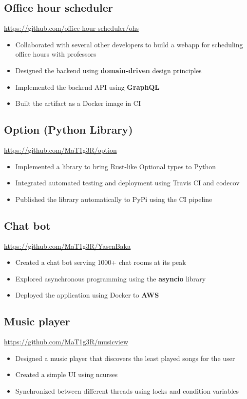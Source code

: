 \documentclass[letterpaper,12pt,oneside]{article}
\newcommand{\smallurl}[1]{\footnotesize{\url{#1}}\normalsize}
\begin{document}
\subsection*{Office hour scheduler \hfill {}}
\smallurl{https://github.com/office-hour-scheduler/ohs}
\begin{itemize}
      \setlength\itemsep{0em}
      \item Collaborated with several other developers to build a webapp for scheduling office hours with professors
      \item Designed the backend using \textbf{domain-driven} design principles
      \item Implemented the backend API using \textbf{GraphQL}
      \item Built the artifact as a Docker image in CI
\end{itemize}

\subsection*{Option (Python Library) \hfill {}}
\smallurl{https://github.com/MaT1g3R/option}
\begin{itemize}
      \setlength\itemsep{0em}
      \item Implemented a library to bring Rust-like Optional types to Python
      \item Integrated automated testing and deployment using Travis CI and codecov
      \item Published the library automatically to PyPi using the CI pipeline
\end{itemize}

\subsection*{Chat bot \hfill {}}
\smallurl{https://github.com/MaT1g3R/YasenBaka}
\begin{itemize}
      \setlength\itemsep{0em}
      \item Created a chat bot serving 1000+ chat rooms at its peak
      \item Explored asynchronous programming using the \textbf{asyncio} library
      \item Deployed the application using Docker to \textbf{AWS}
\end{itemize}

\subsection*{Music player \hfill {}}
\smallurl{https://github.com/MaT1g3R/musicview}
\begin{itemize}
      \setlength\itemsep{0em}
      \item Designed a music player that discovers the least played songs for the user
      \item Created a simple UI using ncurses
      \item Synchronized between different threads using locks and condition variables
\end{itemize}
\end{document}
